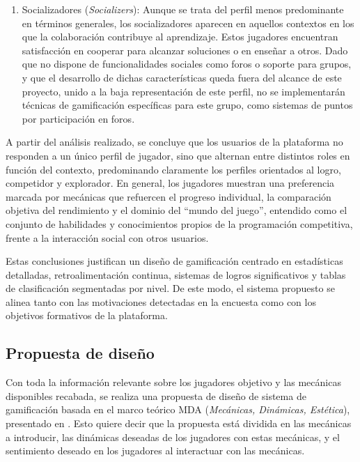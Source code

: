 \begin{enumerate}
    \item Socializadores (\textit{Socializers}): Aunque se trata del perfil menos predominante en términos generales, los socializadores aparecen en aquellos contextos en los que la colaboración contribuye al aprendizaje. Estos jugadores encuentran satisfacción en cooperar para alcanzar soluciones o en enseñar a otros. Dado que \aer no dispone de funcionalidades sociales como foros o soporte para grupos, y que el desarrollo de dichas características queda fuera del alcance de este proyecto, unido a la baja representación de este perfil, no se implementarán técnicas de gamificación específicas para este grupo, como sistemas de puntos por participación en foros.
\end{enumerate}

A partir del análisis realizado, se concluye que los usuarios de la plataforma no responden a un único perfil de jugador, sino que alternan entre distintos roles en función del contexto, predominando claramente los perfiles orientados al logro, competidor y explorador. En general, los jugadores muestran una preferencia marcada por mecánicas que refuercen el progreso individual, la comparación objetiva del rendimiento y el dominio del \enquote{mundo del juego}, entendido como el conjunto de habilidades y conocimientos propios de la programación competitiva, frente a la interacción social con otros usuarios.

Estas conclusiones justifican un diseño de gamificación centrado en estadísticas detalladas, retroalimentación continua, sistemas de logros significativos y tablas de clasificación segmentadas por nivel. De este modo, el sistema propuesto se alinea tanto con las motivaciones detectadas en la encuesta como con los objetivos formativos de la plataforma.

\subsection{Propuesta de diseño}

Con toda la información relevante sobre los jugadores objetivo y las mecánicas disponibles recabada, se realiza una propuesta de diseño de sistema de gamificación basada en el marco teórico MDA (\textit{Mecánicas, Dinámicas, Estética}), presentado en \cite{Zichermann_Cunningham_2011}.  Esto quiere decir que la propuesta está dividida en las mecánicas a introducir, las dinámicas deseadas de los jugadores con estas mecánicas, y el sentimiento deseado en los jugadores al interactuar con las mecánicas. 

